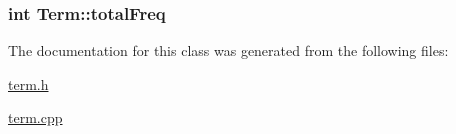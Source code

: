 \subsubsection[{total\+Freq}]{\setlength{\rightskip}{0pt plus 5cm}int Term\+::total\+Freq\hspace{0.3cm}{\ttfamily [private]}}\label{class_term_a075587aedd4009c7c207dc3fdd5b33cd}


The documentation for this class was generated from the following files\+:\begin{DoxyCompactItemize}
\item 
\hyperlink{term_8h}{term.\+h}\item 
\hyperlink{term_8cpp}{term.\+cpp}\end{DoxyCompactItemize}
